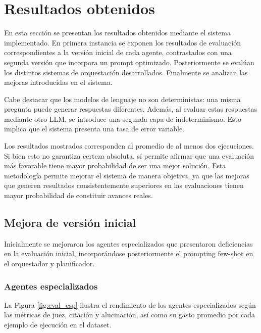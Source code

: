 \section{Resultados obtenidos}
En esta sección se presentan los resultados obtenidos mediante el sistema implementado. En primera instancia se exponen los resultados de evaluación correspondientes a la versión inicial de cada agente, contrastados con una segunda versión que incorpora un prompt optimizado. Posteriormente se evalúan los distintos sistemas de orquestación desarrollados. Finalmente se analizan las mejoras introducidas en el sistema.

Cabe destacar que los modelos de lenguaje no son deterministas: una misma pregunta puede generar respuestas diferentes. Además, al evaluar estas respuestas mediante otro LLM, se introduce una segunda capa de indeterminismo. Esto implica que el sistema presenta una tasa de error variable.

Los resultados mostrados corresponden al promedio de al menos dos ejecuciones. Si bien esto no garantiza certeza absoluta, sí permite afirmar que una evaluación más favorable tiene mayor probabilidad de ser una mejor solución. Esta metodología permite mejorar el sistema de manera objetiva, ya que las mejoras que generen resultados consistentemente superiores en las evaluaciones tienen mayor probabilidad de constituir avances reales.

\subsection{Mejora de versión inicial}
Inicialmente se mejoraron los agentes especializados que presentaron deficiencias en la evaluación inicial, incorporándose posteriormente el prompting few-shot en el orquestador y planificador.

\subsubsection{Agentes especializados}
La Figura \ref{fig:eval_esp} ilustra el rendimiento de los agentes especializados según las métricas de juez, citación y alucinación, así como su gasto promedio por cada ejemplo de ejecución en el dataset.

